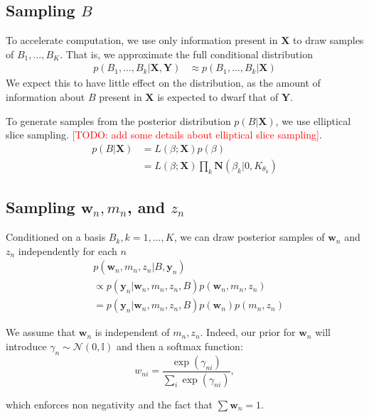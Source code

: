 \documentclass{article}
\newcommand{\red}[1]{\textcolor{red}{[TODO: #1]}}
\begin{document}
\subsection{Sampling $B$}
To accelerate computation, we use only information present in $\mathbf{X}$ to draw samples of $B_1, \dots, B_K$.  That is, we approximate the full conditional distribution 
\begin{align}
  p(B_1,\dots, B_k | \mathbf{X}, \mathbf{Y}) 
    &\approx p(B_1, \dots, B_k | \mathbf{X})
\end{align}
We expect this to have little effect on the distribution, as the amount of information about $B$ present in $\mathbf{X}$ is expected to dwarf that of $\mathbf{Y}$.  

To generate samples from the posterior distribution $p(B | \mathbf{X})$, we use elliptical slice sampling.  \red{add some details about elliptical slice sampling}. 
\begin{align}
  p(B | \mathbf{X}) 
    &= L(\beta; \mathbf{X}) p(\beta) \\
    &= L(\beta; \mathbf{X}) \prod_{k} \mathbf{N}(\beta_k | 0, K_{\theta_k})
\end{align}

\subsection{Sampling $\mathbf{w}_n, m_n$, and $z_n$}
Conditioned on a basis $B_k, k=1,\dots, K$, we can draw posterior samples of $\mathbf{w}_n$ and $z_n$ independently for each $n$
\begin{align}
  &p(\mathbf{w}_n, m_n, z_n | B, \mathbf{y}_n) \\
  &\propto p(\mathbf{y}_n | \mathbf{w}_n, m_n, z_n, B) p(\mathbf{w}_n, m_n, z_n) \\
  &= p(\mathbf{y}_n | \mathbf{w}_n, m_n, z_n, B) p(\mathbf{w}_n) p(m_n, z_n)
\end{align}

We assume that $\mathbf{w}_n$ is independent of $m_n, z_n$. Indeed, our prior for $\mathbf{w}_n$ will 
introduce $\gamma_n \sim \mathcal{N}(0, \mathbb{I})$ and then a softmax function:
\begin{equation*}
w_{ni} = \frac{\exp(\gamma_{ni})}{\sum_i {\exp(\gamma_{ni})}},
\end{equation*}

which enforces non negativity and the fact that $\sum \mathbf{w}_n = 1$.
 


\end{document}
